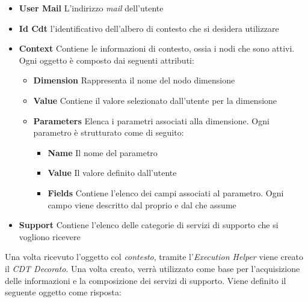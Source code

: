 \begin{itemize}
	\item \textbf{User Mail}
	L'indirizzo \emph{mail} dell'utente
	\item \textbf{Id Cdt}
	\upe l'identificativo dell'albero di contesto che si desidera utilizzare
	\item \textbf{Context}
	Contiene le informazioni di contesto, ossia i nodi che sono attivi. Ogni oggetto è composto dai seguenti attributi:
	\begin{itemize}
		\item \textbf{Dimension}
		Rappresenta il nome del nodo dimensione
		\item \textbf{Value}
		Contiene il valore selezionato dall'utente per la dimensione
		\item \textbf{Parameters}
		Elenca i parametri associati alla dimensione. Ogni parametro è strutturato come di seguito:
		\begin{itemize}
			\item \textbf{Name}
			Il nome del parametro
			\item \textbf{Value}
			Il valore definito dall'utente
			\item \textbf{Fields}
			Contiene l'elenco dei campi associati al parametro. Ogni campo viene descritto dal proprio  e dal  che assume
		\end{itemize}
	\end{itemize}
	\item \textbf{Support}
	Contiene l'elenco delle categorie di servizi di supporto che si vogliono ricevere
\end{itemize}

Una volta ricevuto l'oggetto col \emph{contesto}, tramite l'\emph{Execution Helper} viene creato il \emph{CDT Decorato}. Una volta creato, verrà utilizzato come base per l'acquisizione delle informazioni e la composizione dei servizi di supporto. Viene definito il seguente oggetto come risposta:

